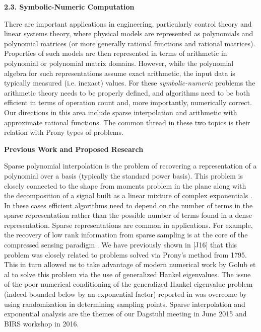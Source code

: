 
\bigskip
\noindent
\textbf{2.3. Symbolic-Numeric Computation}
\bigskip

There are important applications in engineering, particularly control theory and linear systems theory, where physical models are represented as polynomials and polynomial matrices (or more generally rational functions and rational matrices). Properties of such models are then represented in terms of arithmetic in polynomial or polynomial matrix domains. However, while the polynomial algebra for such representations assume exact arithmetic, the input data is typically measured (i.e. inexact) values. For these {\em symbolic-numeric} problems \cite{corless2} the arithmetic theory needs to be properly defined, and algorithms need to be both efficient in terms of operation count and, more importantly, numerically correct. Our directions in this area include sparse interpolation and arithmetic with approximate rational functions. The common thread in these two topics is their relation with Prony types of problems.

\bigskip
\noindent
{\bf Previous Work and Proposed Research}
\bigskip

Sparse polynomial interpolation is the problem of recovering a representation of a polynomial over a basis (typically the standard power basis). This problem is closely connected to the shape from moments problem  in the plane \cite{MilanfarGolub} along with the decomposition of a signal built as a linear mixture of complex exponentials \cite{HuaSarkar}. In these cases efficient algorithms need to depend on the number of terms in the sparse representation rather than the possible number of terms found in a dense representation. Sparse representations 
are common in applications. For example, the recovery of low rank information from sparse sampling is at the core of the
compressed sensing paradigm \cite{candes}. We have previously shown in [J16] that this problem was closely related to problems solved via Prony's method from 1795. This in turn allowed us to take advantage of modern numerical work by Golub et al \cite{golub1} to solve this problem via the use of generalized Hankel eigenvalues. The issue of the poor numerical conditioning of the generalized Hankel eigenvalue problem (indeed bounded below by an exponential factor) reported in  \cite{begola} was overcome by using randomization in determining sampling points. 
Sparse interpolation and exponential analysis are the themes of our Dagstuhl meeting in June 2015 and BIRS workshop in 2016.

